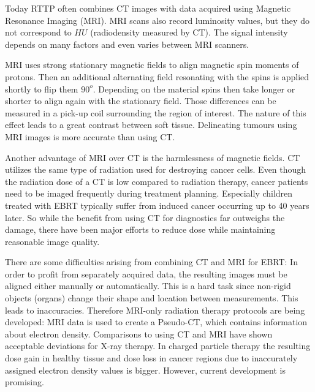 

Today RTTP often combines CT images with data acquired using Magnetic Resonance Imaging (MRI).
MRI scans also record luminosity values, but they do not correspond to $HU$ (radiodensity measured by CT).
The signal intensity depends on many factors and even varies between MRI scanners.

MRI uses strong stationary magnetic fields to align magnetic spin moments of protons. Then an additional alternating field resonating with the spins is applied shortly to flip them $90^o$.
Depending on the material spins then take longer or shorter to align again with the stationary field. Those differences can be measured in a pick-up coil surrounding the
region of interest. The nature of this effect leads to a great contrast between soft tissue. \cite{Currie2013} Delineating tumours using MRI images is more accurate than using CT.
\cite{Rasch1999, Debois1999a, Roach1996}

Another advantage of MRI over CT is the harmlessness of magnetic fields. CT utilizes the same type of radiation used for destroying cancer cells. Even though the radiation dose of a
CT is low compared to radiation therapy, cancer patients need to be imaged frequently during treatment planning. Especially children treated with EBRT typically
suffer from induced cancer occurring up to 40 years later. So while the benefit from using CT for diagnostics far outweighs the damage, there have been major efforts to
reduce dose while maintaining reasonable image quality. \cite{Murphy2007, Brenner2001, Sodickson2009, Smith2007, McCollough2009, Goldman2013}

There are some difficulties arising from combining CT and MRI for EBRT:
In order to profit from separately acquired data, the resulting images must be aligned either manually or automatically. This is a hard task since non-rigid objects (organs) change their shape and location between measurements. This leads to inaccuracies.
Therefore MRI-only radiation therapy protocols are being developed:
MRI data is used to create a Pseudo-CT, which contains information about electron density. Comparisons to using CT and MRI have shown acceptable deviations for X-ray therapy.
In charged particle therapy the resulting dose gain in healthy tissue and dose loss in cancer regions due to inaccurately assigned electron density values is bigger.
However, current development is promising. \cite{Rank2013, Stanescu2006, Nyholm2015, Greer2015, Chen2004}

